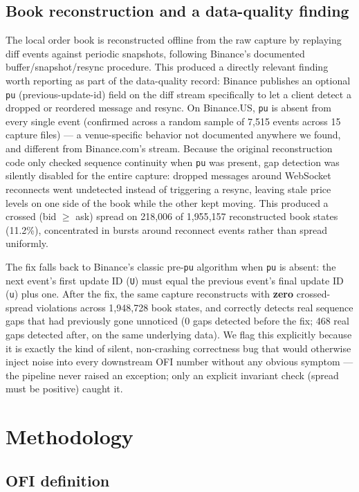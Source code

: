 \documentclass[11pt]{article}
\begin{document}
\subsection{Book reconstruction and a data-quality finding}

The local order book is reconstructed offline from the raw capture by replaying diff events against periodic snapshots, following Binance's documented buffer/snapshot/resync procedure. This produced a directly relevant finding worth reporting as part of the data-quality record: Binance publishes an optional \texttt{pu} (previous-update-id) field on the diff stream specifically to let a client detect a dropped or reordered message and resync. On Binance.US, \texttt{pu} is absent from every single event (confirmed across a random sample of 7{,}515 events across 15 capture files) --- a venue-specific behavior not documented anywhere we found, and different from Binance.com's stream. Because the original reconstruction code only checked sequence continuity when \texttt{pu} was present, gap detection was silently disabled for the entire capture: dropped messages around WebSocket reconnects went undetected instead of triggering a resync, leaving stale price levels on one side of the book while the other kept moving. This produced a crossed (bid $\geq$ ask) spread on 218{,}006 of 1{,}955{,}157 reconstructed book states (11.2\%), concentrated in bursts around reconnect events rather than spread uniformly.

The fix falls back to Binance's classic pre-\texttt{pu} algorithm when \texttt{pu} is absent: the next event's first update ID (\texttt{U}) must equal the previous event's final update ID (\texttt{u}) plus one. After the fix, the same capture reconstructs with \textbf{zero} crossed-spread violations across 1{,}948{,}728 book states, and correctly detects real sequence gaps that had previously gone unnoticed (0 gaps detected before the fix; 468 real gaps detected after, on the same underlying data). We flag this explicitly because it is exactly the kind of silent, non-crashing correctness bug that would otherwise inject noise into every downstream OFI number without any obvious symptom --- the pipeline never raised an exception; only an explicit invariant check (spread must be positive) caught it.

\section{Methodology}

\subsection{OFI definition}
\end{document}
